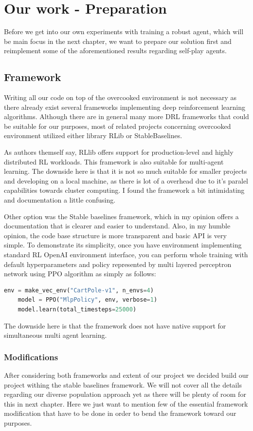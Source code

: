\chapter{Our work - Preparation}
Before we get into our own experiments with training a robust agent, which will be main focus in the next chapter, we want to prepare our solution first and reimplement some of the aforementioned results regarding self-play agents.

\section{Framework}
Writing all our code on top of the overcooked environment is not necessary as there already exist several frameworks implementing deep reinforcement learning algorithms.
Although there are in general many more DRL frameworks that could be suitable for our purposes, most of related projects concerning overcooked environment utilized either library RLib or StableBaselines.

As authors themself say, RLlib offers support for production-level and highly distributed RL workloads.
This framework is also suitable for multi-agent learning.
The downside here is that it is not so much suitable for smaller projects and developing on a local machine, as there is lot of a overhead due to it's paralel capabilities towards cluster computing.
I found the framework a bit intimidating and documentation a little confusing.

Other option was the Stable baselines framework, which in my opinion offers a documentation that is clearer and easier to understand.
Also, in my humble opinion, the code base structure is more transparent and basic API is very simple.
To demonstrate its simplicity, once you have environment implementing standard RL OpenAI environment interface, you can perform whole training with default hyperparameters and policy represented by multi layered perceptron network using PPO algorithm as simply as follows:
\begin{lstlisting}[language=Python]
    env = make_vec_env("CartPole-v1", n_envs=4)
    model = PPO("MlpPolicy", env, verbose=1)
    model.learn(total_timesteps=25000)

\end{lstlisting}
The downside here is that the framework does not have native support for simultaneous multi agent learning.

\subsection{Modifications}
After considering both frameworks and extent of our project we decided build our project withing the stable baselines framework.
We will not cover all the details regarding our diverse population approach yet as there will be plenty of room for this in next chapter.
Here we just want to mention few of the essential framework modification that have to be done in order to bend the framework toward our purposes.

